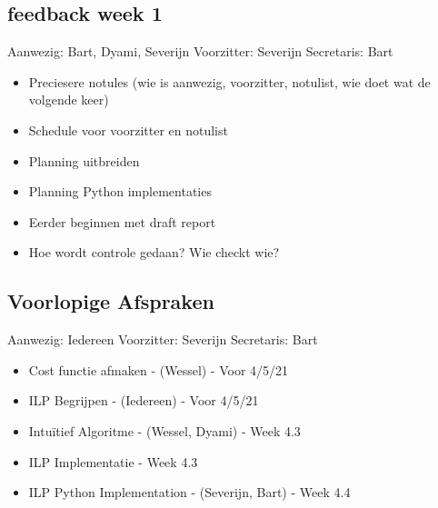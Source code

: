 \documentclass{article}
\begin{document}
\subsection*{feedback week 1}
Aanwezig: Bart, Dyami, Severijn \newline
Voorzitter: Severijn \newline
Secretaris: Bart \newline
\begin{itemize}
    \item Preciesere notules (wie is aanwezig, voorzitter, notulist, wie doet wat de volgende keer)
    \item Schedule voor voorzitter en notulist
    \item Planning uitbreiden
    \item Planning Python implementaties
    \item Eerder beginnen met draft report
    \item Hoe wordt controle gedaan? Wie checkt wie?
\end{itemize}

\subsection*{Voorlopige Afspraken}
Aanwezig: Iedereen \newline
Voorzitter: Severijn \newline
Secretaris: Bart \newline
\begin{itemize}
    \item Cost functie afmaken - (Wessel) - Voor 4/5/21
    \item ILP Begrijpen - (Iedereen) - Voor 4/5/21    \item Intuïtief Algoritme - (Wessel, Dyami) - Week 4.3
    \item ILP Implementatie -  Week 4.3
    \item ILP Python Implementation - (Severijn, Bart) - Week 4.4
\end{itemize}
\end{document}

